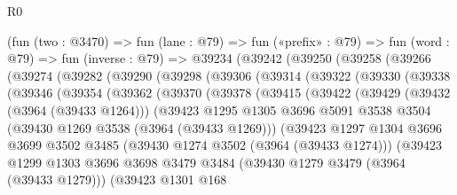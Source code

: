 \begin{lexlean}{R0}
\begin{coremodule}
    (fun (two : @3470) =>
    fun (lane : @79) =>
    fun («prefix» : @79) =>
    fun (word : @79) =>
    fun (inverse : @79) =>
    @39234
      (@39242
        (@39250
          (@39258
            (@39266
              (@39274
                (@39282
                  (@39290
                    (@39298
                      (@39306
                        (@39314
                          (@39322
                            (@39330
                              (@39338
                                (@39346
                                  (@39354
                                    (@39362
                                      (@39370
                                        (@39378
                                          (@39415
                                            (@39422
                                              (@39429
                                                (@39432 (@3964 (@39433 @1264)))
                                                (@39423
                                                  @1295
                                                  @1305
                                                  @3696
                                                  @5091
                                                  @3538
                                                  @3504
                                                  (@39430 @1269 @3538 (@3964 (@39433 @1269)))
                                                  (@39423
                                                    @1297
                                                    @1304
                                                    @3696
                                                    @3699
                                                    @3502
                                                    @3485
                                                    (@39430 @1274 @3502 (@3964 (@39433 @1274)))
                                                    (@39423
                                                      @1299
                                                      @1303
                                                      @3696
                                                      @3698
                                                      @3479
                                                      @3484
                                                      (@39430 @1279 @3479 (@3964 (@39433 @1279)))
                                                      (@39423
                                                        @1301
                                                        @168

\end{coremodule}
\end{lexlean}
